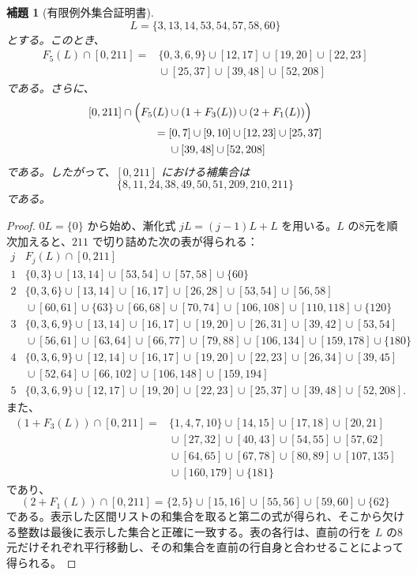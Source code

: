 \documentclass[12pt]{ltjsarticle}
\theoremstyle{plain}
\newtheorem{lemma}[theorem]{補題}
\theoremstyle{definition}
\theoremstyle{plain}
\begin{document}
\begin{lemma}[有限例外集合証明書]\label{lem:finiteexception}
\[
 L=\{3,13,14,53,54,57,58,60\}
\]
とする。このとき、
\[
\begin{aligned}
F_5(L)\cap[0,211]
={}&\{0,3,6,9\}\cup[12,17]\cup[19,20]\cup[22,23]\\
 &{}\cup[25,37]\cup[39,48]\cup[52,208]
\end{aligned}
\]
である。さらに、
\[
\begin{aligned}
[0,211]\cap\Bigl(F_5(L)&\cup(1+F_3(L))\cup(2+F_1(L))\Bigr)\\
={}&[0,7]\cup[9,10]\cup[12,23]\cup[25,37]\\
 &{}\cup[39,48]\cup[52,208]
\end{aligned}
\]
である。したがって、$[0,211]$ における補集合は
\[
 \{8,11,24,38,49,50,51,209,210,211\}
\]
である。
\end{lemma}

\begin{proof}
$0L=\{0\}$ から始め、漸化式 $jL=(j-1)L+L$ を用いる。$L$ の8元を順次加えると、$211$ で切り詰めた次の表が得られる：
\[
\begin{array}{c|l}
j & F_j(L)\cap[0,211]\\
\hline
1 & \{0,3\}\cup[13,14]\cup[53,54]\cup[57,58]\cup\{60\}\\
2 & \{0,3,6\}\cup[13,14]\cup[16,17]\cup[26,28]\cup[53,54]\cup[56,58]\\
  & {}\cup[60,61]\cup\{63\}\cup[66,68]\cup[70,74]\cup[106,108]\cup[110,118]\cup\{120\}\\
3 & \{0,3,6,9\}\cup[13,14]\cup[16,17]\cup[19,20]\cup[26,31]\cup[39,42]\cup[53,54]\\
  & {}\cup[56,61]\cup[63,64]\cup[66,77]\cup[79,88]\cup[106,134]\cup[159,178]\cup\{180\}\\
4 & \{0,3,6,9\}\cup[12,14]\cup[16,17]\cup[19,20]\cup[22,23]\cup[26,34]\cup[39,45]\\
  & {}\cup[52,64]\cup[66,102]\cup[106,148]\cup[159,194]\\
5 & \{0,3,6,9\}\cup[12,17]\cup[19,20]\cup[22,23]\cup[25,37]\cup[39,48]\cup[52,208].
\end{array}
\]
また、
\[
\begin{aligned}
(1+F_3(L))\cap[0,211]
={}&\{1,4,7,10\}\cup[14,15]\cup[17,18]\cup[20,21]\\
 &{}\cup[27,32]\cup[40,43]\cup[54,55]\cup[57,62]\\
 &{}\cup[64,65]\cup[67,78]\cup[80,89]\cup[107,135]\\
 &{}\cup[160,179]\cup\{181\}
\end{aligned}
\]
であり、
\[
 (2+F_1(L))\cap[0,211]
 =\{2,5\}\cup[15,16]\cup[55,56]\cup[59,60]\cup\{62\}
\]
である。表示した区間リストの和集合を取ると第二の式が得られ、そこから欠ける整数は最後に表示した集合と正確に一致する。表の各行は、直前の行を $L$ の8元だけそれぞれ平行移動し、その和集合を直前の行自身と合わせることによって得られる。
\end{proof}
\end{document}
